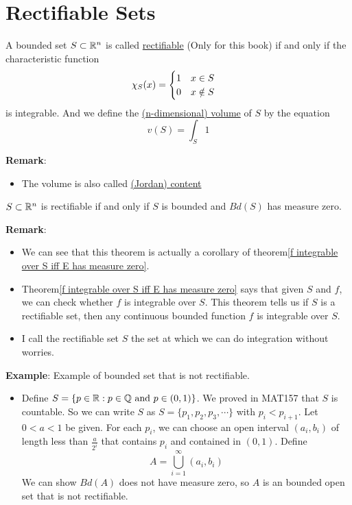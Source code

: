 \section{Rectifiable Sets}

\begin{definition}
    A bounded set $S\subset \mathbb{R}^n$ is called \underline{rectifiable} (Only for this book) if and only if  the characteristic function 
    \begin{equation}
        \chi_S(x)=\begin{cases}
            1 \text{\quad}x\in S\\
            0 \text{\quad}x\notin S
        \end{cases}
    \end{equation} is integrable. And we define the \underline{(n-dimensional) volume} of $S$ by the equation $$v(S)=\int_S1$$
\end{definition}
\noindent \textbf{Remark}:
\begin{itemize}
    \item The volume is also called \underline{(Jordan) content}
\end{itemize}

\begin{theorem}
    $S\subset \mathbb{R}^n$ is rectifiable if and only if $S$ is bounded and $Bd(S)$ has measure zero.
\end{theorem}
\noindent \textbf{Remark}:
\begin{itemize}
    \item We can see that this theorem is actually a corollary of theorem\ref{f integrable over S iff E has measure zero}.
    \item Theorem\ref{f integrable over S iff E has measure zero} says that given $S$ and $f$, we can check whether $f$ is integrable over $S$. This theorem tells us if $S$ is a rectifiable set, then any continuous bounded function $f$ is integrable over $S$.
    \item I call the rectifiable set $S$ the set at which we can do integration without worries.
\end{itemize}

\noindent \textbf{Example}: Example of bounded set that is not rectifiable.
\begin{itemize}
    \item Define $S=\{p\in \mathbb{R}: p\in \mathbb{Q} \text{ and }p\in (0,1)\}$. We proved in MAT157 that $S$ is countable. So we can write $S$ as $S=\{p_1,p_2,p_3,\cdots\}$ with $p_i<p_{i+1}$. 
    Let $0<a<1$ be given. For each $p_i$, we can choose an open interval $(a_i,b_i)$ of length less than $\frac{a}{2^i}$ that contains $p_i$ and contained in $(0,1)$. Define $$A=\bigcup_{i=1}^{\infty}(a_i,b_i)$$
    We can show $Bd(A)$ does not have measure zero, so $A$ is an bounded open set that is not rectifiable.
\end{itemize}

